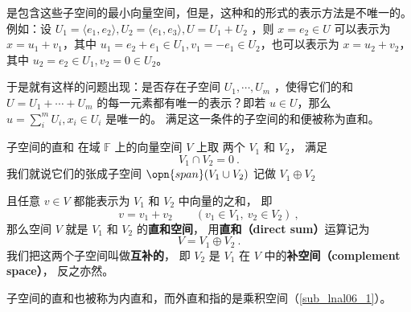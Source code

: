 
\begin{issues}
\issueTODO
\end{issues}


是包含这些子空间的最小向量空间，但是，这种和的形式的表示方法是不唯一的。例如：设 $U_1=\langle e_1,e_2\rangle,U_2=\langle e_1,e_3\rangle, U=U_1+U_2$ ，则 $x=e_2\in U$ 可以表示为 $x=u_1+v_1$，其中 $u_1=e_2+e_1\in U_1,v_1=-e_1\in U_2$，也可以表示为 $x=u_2+v_2$，其中 $u_2=e_2\in U_1,v_2=0\in U_2$。 

于是就有这样的问题出现：是否存在子空间 $U_1,\cdots,U_m$ ，使得它们的和 $U=U_1+\cdots+U_m$ 的每一元素都有唯一的表示？即若 $u\in U$，那么 $u=\sum_{i}^m U_i,x_i\in U_i$ 是唯一的。 满足这一条件的子空间的和便被称为直和。




\begin{definition}{子空间的直和}\label{def_DirSum_1}
在域 $\mathbb F$ 上的向量空间 $V$ 上取 两个 $V_1$ 和 $V_2$， 满足
\begin{equation}
V_1 \cap V_2 = \qty{0}~.
\end{equation}
我们就说它们的张成子空间 $\opn{span} (V_1 \cup V_2)$ 记做 $V_1 \oplus V_2$

且任意 ${v} \in V$ 都能表示为 $V_1$ 和 $V_2$ 中向量的之和， 即
\begin{equation}\label{eq_DirSum_2}
v = v_1 + v_2
\qquad
(v_1 \in V_1,\ v_2 \in V_2)~,
\end{equation}
那么空间 $V$ 就是 $V_1$ 和 $V_2$ 的\textbf{直和空间}， 用\textbf{直和（direct sum）}运算记为
\begin{equation}
V = V_1 \oplus V_2~.
\end{equation}
我们把这两个子空间叫做\textbf{互补的}， 即 $V_2$ 是 $V_1$ 在 $V$ 中的\textbf{补空间（complement space）}， 反之亦然。
\end{definition}

子空间的直和也被称为内直和，而外直和指的是乘积空间（\autoref{sub_lnal06_1}）。


